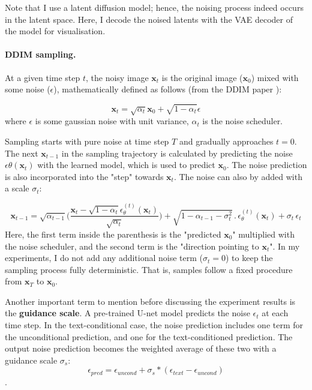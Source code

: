 Note that I use a latent diffusion model; hence, the noising process indeed occurs in the latent space. Here, I decode the noised latents with the VAE decoder of the model for visualisation. 

\paragraph{DDIM sampling.}
At a given time step $t$, the noisy image $\bm{x}_t$ is the original image ($\bm{x}_0$) mixed with some noise ($\epsilon$), mathematically defined as follows (from the DDIM paper \cite{song2020denoising}):

\begin{equation}
\bm{x}_t = \sqrt{\alpha_t}\bm{x}_0 + \sqrt{1 - \alpha_t}\epsilon
\end{equation}
where $\epsilon$ is some gaussian noise with unit variance, $\alpha_t$ is the noise scheduler. 

Sampling starts with pure noise at time step $T$ and gradually approaches $t = 0$. The next $\bm{x}_{t-1}$ in the sampling trajectory is calculated by predicting the noise $\epsilon\theta(\bm{x}_t)$ with the learned model, which is used to predict $\bm{x}_0$. The noise prediction is also incorporated into the "step" towards $\bm{x}_t$. The noise can also by added with a scale $\sigma_t$:

\begin{equation}
\bm{x}_{t -1} = \sqrt{\alpha_{t - 1}}\biggl(\frac{\bm{x}_t - \sqrt{1 - \alpha_t}\epsilon_{\theta}^{(t)}(\bm{x}_t)}{\sqrt{\alpha_t}}\biggl) + \sqrt{1 - \alpha_{t - 1} - \sigma_t^2} \, . \, \epsilon_{\theta}^{(t)}(\bm{x}_t) + \sigma_t \, \epsilon_t
\label{eq:ddim-sample}
\end{equation}
Here, the first term inside the parenthesis is the "predicted $\bm{x}_0$" multiplied with the noise scheduler, and the second term is the "direction pointing to $\bm{x}_t$". In my experiments, I do not add any additional noise term ($\sigma_t = 0$) to keep the sampling process fully deterministic. That is, samples follow a fixed procedure from $\bm{x}_T$ to $\bm{x}_0$.

Another important term to mention before discussing the experiment results is the \textbf{guidance scale}. A pre-trained U-net model predicts the noise $\epsilon_t$ at each time step. In the text-conditional case, the noise prediction includes one term for the unconditional prediction, and one for the text-conditioned prediction. The output noise prediction becomes the weighted average of these two with a guidance scale $\sigma_s$:
$$\epsilon_{pred} = \epsilon_{uncond} + \sigma_s * (\epsilon_{text} - \epsilon_{uncond} )$$.

